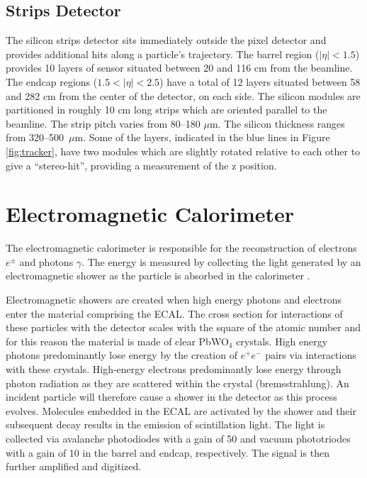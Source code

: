 \subsection{Strips Detector}

The silicon strips detector sits immediately outside the pixel detector and provides additional hits along a particle's trajectory. The barrel region ($|\eta|<1.5$) provides 10 layers of sensor situated between 20 and 116 cm from the beamline. The endcap regions ($1.5<|\eta|<2.5$) have a total of 12 layers situated between 58 and 282 cm from the center of the detector, on each side. The silicon modules are partitioned in roughly 10 cm long strips which are oriented parallel to the beamline. The strip pitch varies from 80--180 $\mu$m. The silicon thickness ranges from 320--500~$\mu$m. Some of the layers, indicated in the blue lines in Figure \ref{fig:tracker}, have two modules which are slightly rotated relative to each other to give a ``stereo-hit'', providing a measurement of the z position.

\section{Electromagnetic Calorimeter}

The electromagnetic calorimeter is responsible for the reconstruction of electrons $e^{\pm}$ and photons $\gamma$. The energy is measured by collecting the light generated by an electromagnetic shower as the particle is absorbed in the calorimeter \cite{ecaltdr, ecaltdradd}. 

Electromagnetic showers are created when high energy photons and electrons enter the material comprising the ECAL. The cross section for interactions of these particles with the detector scales with the square of the atomic number and for this reason the material is made of clear PbWO$_{4}$ crystals. High energy photons predominantly lose energy by the creation of $e^{+}e^{-}$ pairs via interactions with these crystals. High-energy electrons predominantly lose energy through photon radiation as they are scattered within the crystal (bremsstrahlung). An incident particle will therefore cause a shower in the detector as this process evolves. Molecules embedded in the ECAL are activated by the shower and their subsequent decay results in the emission of scintillation light. The light is collected via avalanche photodiodes with a gain of 50 and vacuum phototriodes with a gain of 10 in the barrel and endcap, respectively. The signal is then further amplified and digitized.

